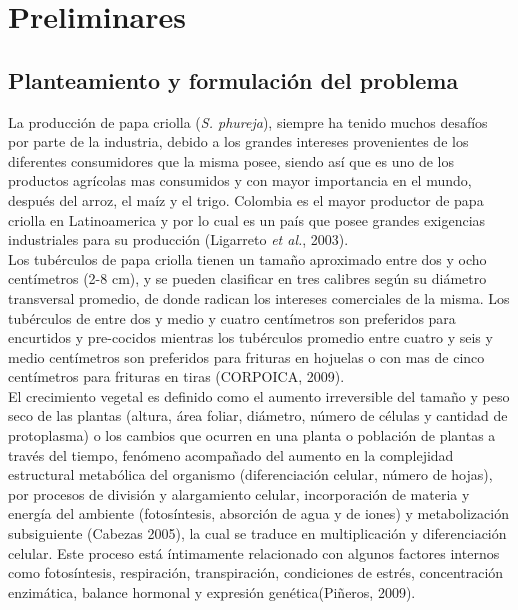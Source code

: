 \chapter{Preliminares}

\section{Planteamiento y formulación del problema}

La producción de papa criolla (\textit{S. phureja}), siempre ha tenido muchos desafíos por parte de la industria, debido a los grandes intereses provenientes de los diferentes consumidores que la misma posee, siendo así que es uno de los productos agr\'icolas mas consumidos y con mayor importancia en el mundo, después del arroz, el ma\'iz y el trigo. Colombia es el mayor productor de papa criolla en Latinoamerica y por lo cual es un pa\'is que posee grandes exigencias industriales para su producción (Ligarreto \textit{et al.}, 2003).\\

Los tubérculos de papa criolla tienen un tamaño aproximado entre dos y ocho centímetros (2-8 cm), y se pueden clasificar en tres calibres según su diámetro transversal promedio,  de donde radican los intereses comerciales de la misma. Los tubérculos de entre dos y medio y cuatro centímetros son preferidos para encurtidos y pre-cocidos mientras los tubérculos promedio entre cuatro y seis y medio centímetros son preferidos para frituras en hojuelas o con mas de cinco centímetros para frituras en tiras (CORPOICA, 2009).\\

El crecimiento vegetal es definido  como el aumento irreversible del tamaño y peso seco de las plantas (altura, área foliar, diámetro, número de células y cantidad de protoplasma) o los cambios que ocurren en una planta o población de plantas a través del tiempo, fenómeno acompañado del aumento en la complejidad estructural metabólica del organismo (diferenciación celular, número de hojas), por procesos de división y alargamiento celular, incorporación de materia y energía del ambiente (fotosíntesis, absorción de agua y de iones) y metabolización subsiguiente (Cabezas 2005), la cual se traduce en multiplicación y diferenciación celular. Este proceso está íntimamente relacionado con algunos factores internos como fotosíntesis, respiración, transpiración, condiciones de estrés, concentración enzimática, balance hormonal y expresión genética(Piñeros, 2009).\\

